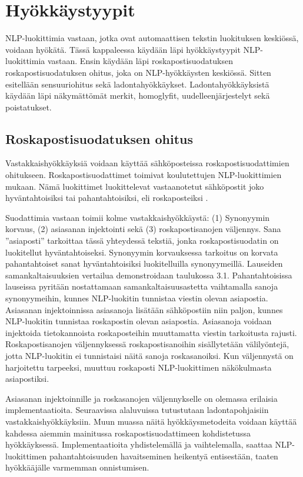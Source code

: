 \chapter{Hyökkäystyypit\label{results}}

NLP-luokittimia vastaan, jotka ovat automaattisen tekstin luokituksen keskiössä, voidaan hyökätä. Tässä kappaleessa käydään läpi hyökkäystyypit NLP-luokittimia vastaan. Ensin käydään läpi roskapostisuodatuksen roskapostisuodatuksen ohitus, joka on NLP-hyökkäysten keskiössä. Sitten esitellään sensuuriohitus sekä ladontahyökkäykset. Ladontahyökkäyksistä käydään läpi näkymättömät merkit, homoglyfit, uudelleenjärjestelyt sekä poistatukset.

\section{Roskapostisuodatuksen ohitus}
Vastakkaishyökkäyksiä voidaan käyttää sähköposteissa roskapostisuodattimien ohitukseen. Roskapostisuodattimet toimivat koulutettujen NLP-luokittimien mukaan. Nämä luokittimet luokittelevat vastaanotetut sähköpostit joko hyväntahtoisiksi tai pahantahtoisiksi, eli roskaposteiksi \citep{spamfilter}.

Suodattimia vastaan toimii kolme vastakkaishyökkäystä: (1) Synonyymin korvaus, (2) asiasanan injektointi sekä (3) roskapostisanojen väljennys. Sana ''asiaposti'' tarkoittaa tässä yhteydessä tekstiä, jonka roskapostisuodatin on luokitellut hyväntahtoiseksi. Synonyymin korvauksessa tarkoitus on korvata pahantahtoiset sanat hyväntahtoisiksi luokitelluilla synonyymeillä. Lauseiden samankaltaisuuksien vertailua demonstroidaan taulukossa 3.1. Pahantahtoisissa lauseissa pyritään nostattamaan samankaltaisuusastetta vaihtamalla sanoja synonyymeihin, kunnes NLP-luokitin tunnistaa viestin olevan asiapostia. Asiasanan injektoinnissa asiasanoja lisätään sähköpostiin niin paljon, kunnes NLP-luokitin tunnistaa roskapostin olevan asiapostia. Asiasanoja voidaan injektoida tietokannoista roskaposteihin muuttamatta viestin tarkoitusta rajusti. Roskapostisanojen väljennyksessä roskapostisanoihin sisällytetään välilyöntejä, jotta NLP-luokitin ei tunnistaisi näitä sanoja roskasanoiksi. Kun väljennystä on harjoitettu tarpeeksi, muuttuu roskaposti NLP-luokittimen näkökulmasta asiapostiksi. \citep{spamfilter}

Asiasanan injektoinnille ja roskasanojen väljennykselle on olemassa erilaisia implementaatioita. Seuraavissa alaluvuissa tutustutaan ladontapohjaisiin vastakkaishyökkäyksiin. Muun muassa näitä hyökkäysmetodeita voidaan käyttää kahdessa aiemmin mainitussa roskapostisuodattimeen kohdistetussa hyökkäyksessä. Implementaatioita yhdistelemällä ja vaihtelemalla, saattaa NLP-luokittimen pahantahtoisuuden havaitseminen heikentyä entisestään, taaten hyökkääjälle varmemman onnistumisen.

